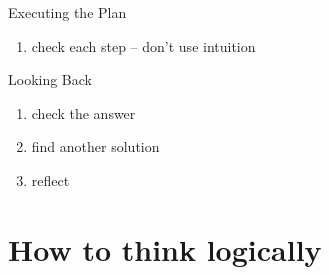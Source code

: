 \documentclass[12pt]{book}
\begin{document}
\begin{definition}{Executing the Plan}{}
	\begin{enumerate}[label = {(\alph*)}]
		\item check each step – don’t use intuition
	\end{enumerate}
\end{definition}

\begin{definition}{Looking Back}{}
	\begin{enumerate}[label = {(\alph*)}]
		\item check the answer
		\item find another solution
		\item reflect
	\end{enumerate}
\end{definition}

\part{How to think logically}



\printbibliography{}
\end{document}
